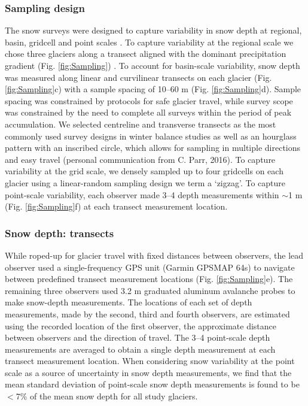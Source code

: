 \documentclass[twocolumn, letterpaper]{igs}
\begin{document}
\subsubsection{Sampling design}

The snow surveys were designed to capture variability in snow depth at regional, basin, gridcell and point scales \citep{Clark2011}. To capture variability at the regional scale we chose three glaciers along a transect aligned with the dominant precipitation gradient  (Fig. \ref{fig:Sampling}) \citep{Taylor1969}. To account for basin-scale variability, snow depth was measured along linear and curvilinear transects on each glacier (Fig. \ref{fig:Sampling}c) with a sample spacing of 10--60 m (Fig. \ref{fig:Sampling}d). Sample spacing was constrained by protocols for safe glacier travel, while survey scope was constrained by the need to complete all surveys within the period of peak accumulation. We selected centreline and transverse transects as the most commonly used survey designs in winter balance studies \citep[e.g.][]{Kaser2003, Machguth2006} as well as an hourglass pattern with an inscribed circle, which allows for sampling in multiple directions and easy travel (personal communication from C. Parr, 2016). To capture variability at the grid scale, we densely sampled up to four gridcells on each glacier using a linear-random sampling design \citep{Shea2010} we term a `zigzag'. To capture point-scale variability, each observer made 3--4 depth measurements within $\sim$1 m (Fig. \ref{fig:Sampling}f) at each transect measurement location. 

\subsubsection{Snow depth: transects}

While roped-up for glacier travel with fixed distances between observers, the lead observer used a single-frequency GPS unit (Garmin GPSMAP 64s) to navigate between predefined transect measurement locations (Fig. \ref{fig:Sampling}e). The remaining three observers used 3.2 m graduated aluminum avalanche probes to make snow-depth measurements. The locations of each set of depth measurements, made by the second, third and fourth observers, are estimated using the recorded location of the first observer, the approximate distance between observers and the direction of travel. The 3--4 point-scale depth measurements are averaged to obtain a single depth measurement at each transect measurement location. When considering snow variability at the point scale as a source of uncertainty in snow depth measurements, we find that the mean standard deviation of point-scale snow depth measurements is found to be $<$7\% of the mean snow depth for all study glaciers.
\end{document}
